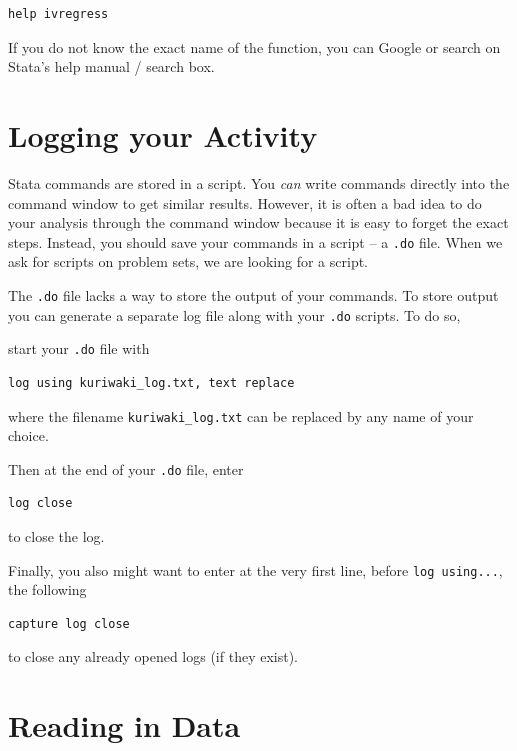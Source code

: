 \documentclass[]{article}
\begin{document}
\begin{verbatim}
help ivregress
\end{verbatim}

If you do not know the exact name of the function, you can Google or
search on Stata's help manual / search box.

\section{Logging your Activity}\label{logging-your-activity}

Stata commands are stored in a script. You \emph{can} write commands
directly into the command window to get similar results. However, it is
often a bad idea to do your analysis through the command window because
it is easy to forget the exact steps. Instead, you should save your
commands in a script -- a \texttt{.do} file. When we ask for scripts on
problem sets, we are looking for a script.

The \texttt{.do} file lacks a way to store the output of your commands.
To store output you can generate a separate log file along with your
\texttt{.do} scripts. To do so,

start your \texttt{.do} file with

\begin{verbatim}
log using kuriwaki_log.txt, text replace
\end{verbatim}

where the filename \texttt{kuriwaki\_log.txt} can be replaced by any
name of your choice.

Then at the end of your \texttt{.do} file, enter

\begin{verbatim}
log close
\end{verbatim}

to close the log.

Finally, you also might want to enter at the very first line, before
\texttt{log\ using...}, the following

\begin{verbatim}
capture log close
\end{verbatim}

to close any already opened logs (if they exist).

\section{Reading in Data}\label{reading-in-data}
\end{document}
